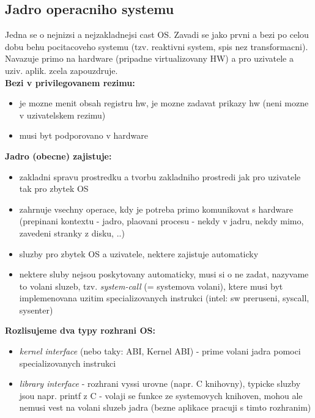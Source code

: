 \documentclass[a4paper, 11pt]{article}
\begin{document}
\newpage

\subsection{Jadro operacniho systemu}

Jedna se o nejnizsi a nejzakladnejsi cast OS. Zavadi se jako prvni a bezi po celou dobu behu pocitacoveho systemu (tzv. reaktivni system, spis nez transformacni). Navazuje primo na hardware (pripadne virtualizovany HW) a pro uzivatele a uziv. aplik. zcela zapouzdruje. \\

\noindent\textbf{Bezi v privilegovanem rezimu:}
\begin{itemize}
    \item je mozne menit obsah registru hw, je mozne zadavat prikazy hw (neni mozne v uzivatelskem rezimu)
    \item musi byt podporovano v hardware \\
\end{itemize}

\noindent\textbf{Jadro (obecne) zajistuje:}
\begin{itemize}
    \item zakladni spravu prostredku a tvorbu zakladniho prostredi jak pro uzivatele tak pro zbytek OS
    \item zahrnuje vsechny operace, kdy je potreba primo komunikovat s hardware (prepinani kontextu - jadro, plaovani procesu - nekdy v jadru, nekdy mimo, zavedeni stranky z disku, ..)
    \item sluzby pro zbytek OS a uzivatele, nektere zajistuje automaticky
    \item nektere sluby nejsou poskytovany automaticky, musi si o ne zadat, nazyvame to volani sluzeb, tzv. \textit{system-call} \label{syscall} (= systemova volani), ktere musi byt implemenovana uzitim specializovanych instrukci (intel: sw preruseni, syscall, sysenter) \\
\end{itemize}

\noindent\textbf{Rozlisujeme dva typy rozhrani OS:} \label{kernel-interfaces}
\begin{itemize}
    \item \textit{kernel interface} (nebo taky: ABI, Kernel ABI) - prime volani jadra pomoci specializovanych instrukci
    \item \textit{library interface} - rozhrani vyssi urovne (napr. C knihovny), typicke sluzby jsou napr. printf z C - volaji se funkce ze         systemovych knihoven, mohou ale nemusi vest na volani sluzeb jadra (bezne aplikace pracuji s timto rozhranim) \\
\end{itemize}
\end{document}
